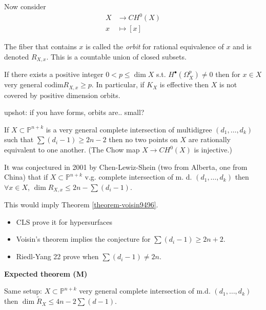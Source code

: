 \noindent
Now consider
$$
\begin{aligned}
X  &\longrightarrow CH^0(X) \\
x &\longmapsto [x]
\end{aligned}
$$

\noindent
The fiber that contains $x$ is called the
{\it orbit} for rational equivalence of $x$ and
is denoted $R_{X,x}$.
This is a countable union of closed subsets.

\begin{theorem}
\label{theorem-mumford-roitman}
If there exists a positive integer $0<p\leq
\dim X$ s.t. $H^\bullet(\Omega^p_X)\neq 0$
then for $x \in X$ very general
$\text{codim} R_{X,x} \geq p$.
In particular, if $K_X$ is effective then
$X$ is not covered by positive dimension
orbits.
\end{theorem}

\noindent
upshot: if you have forms, orbits are..
small?

\begin{theorem}[Voisin, 94-96]
\label{theorem-voisin9496}
If $X \subset \mathbb{P}^{n+k}$
is a very general complete intersection
of multidigree $(d_1,…,d_k)$
such that $\sum(d_i-1) \geq  2n-2$
then no two points on $X$ are rationally
equivalent to one another.
(The Chow map $X \to CH^0(X)$ is injective.)
\end{theorem}

\noindent
It was conjectured in 2001 by 
Chen-Lewiz-Shein (two from Alberta,
one from China) that
if $X \subset \mathbb{P}^{n+k}$
v.g. complete intersection of m. d.
$(d_1,…,d_k)$ then $\forall x \in X$,
$\dim R_{X,x} \leq  2n- \sum(d_i-1)$.

This would imply Theorem
\ref{theorem-voisin9496}.

\begin{remark}
\label{remark-rat-equiv-chow}
\begin{itemize}
\item CLS prove it for hypersurfaces
\item  Voisin's theorem
implies the conjecture
for $\sum(d_i-1) \geq 2n+2$.
\item Riedl-Yang 22 prove when
$\sum (d_i-1) \neq 2n$.
\end{itemize}
\end{remark}

\medskip\noindent
{\bf Expected theorem (M)}

Same setup: $X \subset \mathbb{P}^{n+k}$
very general complete intersection
of m.d. $(d_1,…,d_k)$ then 
$\dim \tilde{R}_X \leq  4n-2
\sum(d-1)$.


